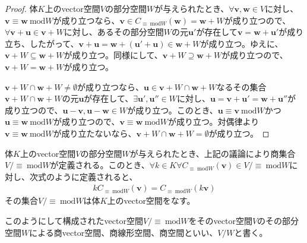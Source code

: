 \documentclass[dvipdfmx]{jsarticle}
\begin{document}
\begin{proof}
体$K$上のvector空間$V$の部分空間$W$が与えられたとき、$\forall\mathbf{v},\mathbf{w} \in V$に対し、$\mathbf{v} \equiv \mathbf{w}\ \mathrm{mod}W$が成り立つなら、$\mathbf{v} \in C_{\equiv \ \mathrm{mod}W}\left( \mathbf{w} \right) = \mathbf{w} + W$が成り立つので、$\forall\mathbf{v} + \mathbf{u} \in \mathbf{v} + W$に対し、あるその部分空間$W$の元$\mathbf{u}'$が存在して$\mathbf{v} = \mathbf{w} + \mathbf{u}'$が成り立ち、したがって、$\mathbf{v} + \mathbf{u} = \mathbf{w} + \left( \mathbf{u}' + \mathbf{u} \right) \in \mathbf{w} + W$が成り立つ。ゆえに、$\mathbf{v} + W \subseteq \mathbf{w} + W$が成り立つ。同様にして、$\mathbf{v} + W \supseteq \mathbf{w} + W$が成り立つので、$\mathbf{v} + W = \mathbf{w} + W$が成り立つ。\par
$\mathbf{v} + W \cap \mathbf{w} + W \neq \emptyset$が成り立つなら、$\mathbf{u} \in \mathbf{v} + W \cap \mathbf{w} + W$なるその集合$\mathbf{v} + W \cap \mathbf{w} + W$の元$\mathbf{u}$が存在して、$\exists\mathbf{u}',\mathbf{u}'' \in W$に対し、$\mathbf{u} = \mathbf{v} + \mathbf{u}' = \mathbf{w} + \mathbf{u}''$が成り立つので、$\mathbf{u} - \mathbf{v},\mathbf{u} - \mathbf{w} \in W$が成り立つ。このとき、$\mathbf{u} \equiv \mathbf{v}\ \mathrm{mod}W$かつ$\mathbf{u} \equiv \mathbf{w}\ \mathrm{mod}W$が成り立つので、$\mathbf{v} \equiv \mathbf{w}\ \mathrm{mod}W$が成り立つ。対偶律より$\mathbf{v} \equiv \mathbf{w}\ \mathrm{mod}W$が成り立たないなら、$\mathbf{v} + W \cap \mathbf{w} + W = \emptyset$が成り立つ。
\end{proof}
\begin{thm}\label{2.4.1.13}
体$K$上のvector空間$V$の部分空間$W$が与えられたとき、上記の議論により商集合${V}/{\equiv \ \mathrm{mod}W}$が定義される。このとき、$\forall k \in K\forall C_{\equiv \ \mathrm{mod}W}\left( \mathbf{v} \right) \in {V}/{\equiv \ \mathrm{mod}W}$に対し、次式のように定義されると、
\begin{align*}
kC_{\equiv \ \mathrm{mod}W}\left( \mathbf{v} \right) = C_{\equiv \ \mathrm{mod}W}\left( k\mathbf{v} \right)
\end{align*}
その集合${V}/{\equiv \ \mathrm{mod}W}$は体$K$上のvector空間をなす。
\end{thm}
\begin{dfn}
このようにして構成されたvector空間${V}/{\equiv \ \mathrm{mod}W}$をそのvector空間$V$のその部分空間$W$による商vector空間、商線形空間、商空間といい、${V}/{W}$と書く。
\end{dfn}
\end{document}
